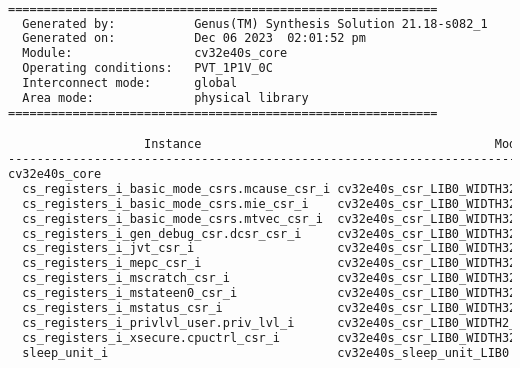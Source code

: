 \begin{lstlisting}[caption={Area report from synthesis of the CV32E40S.}, label=lst:cv32e40s_area, language=txt]

============================================================
  Generated by:           Genus(TM) Synthesis Solution 21.18-s082_1
  Generated on:           Dec 06 2023  02:01:52 pm
  Module:                 cv32e40s_core
  Operating conditions:   PVT_1P1V_0C 
  Interconnect mode:      global
  Area mode:              physical library
============================================================

                   Instance                                         Module                        Cell Count  Cell Area  Net Area   Total Area 
-----------------------------------------------------------------------------------------------------------------------------------------------
cv32e40s_core                                                                                          13525  42548.220 20572.873    63121.093 
  cs_registers_i_basic_mode_csrs.mcause_csr_i cv32e40s_csr_LIB0_WIDTH32_SHADOWCOPY1_RESETVALUE0_          29     43.776    39.057       82.833 
  cs_registers_i_basic_mode_csrs.mie_csr_i    cv32e40s_csr_LIB0_WIDTH32_SHADOWCOPY1_RESETVALUE0_          44     69.084    60.059      129.143 
  cs_registers_i_basic_mode_csrs.mtvec_csr_i  cv32e40s_csr_LIB0_WIDTH32_SHADOWCOPY1_RESETVALUE1_          62     96.102    84.367      180.469 
  cs_registers_i_gen_debug_csr.dcsr_csr_i     cv32e40s_csr_LIB0_WIDTH32_SHADOWCOPY1_RESETVALUE10          24     35.568    33.868       69.436 
  cs_registers_i_jvt_csr_i                    cv32e40s_csr_LIB0_WIDTH32_SHADOWCOPY1_RESETVALUE0_          62     96.102    84.367      180.469 
  cs_registers_i_mepc_csr_i                   cv32e40s_csr_LIB0_WIDTH32_SHADOWCOPY1_RESETVALUE0_          72    113.886    98.736      212.622 
  cs_registers_i_mscratch_csr_i               cv32e40s_csr_LIB0_WIDTH32_SHADOWCOPY1_RESETVALUE0_          75    116.964   102.062      219.026 
  cs_registers_i_mstateen0_csr_i              cv32e40s_csr_LIB0_WIDTH32_SHADOWCOPY1_RESETVALUE0_           2      3.078     2.585        5.663 
  cs_registers_i_mstatus_csr_i                cv32e40s_csr_LIB0_WIDTH32_SHADOWCOPY1_RESETVALUE61          14     22.572    19.519       42.091 
  cs_registers_i_privlvl_user.priv_lvl_i      cv32e40s_csr_LIB0_WIDTH2_SHADOWCOPY1_RESETVALUE3_M           5      7.524     6.272       13.796 
  cs_registers_i_xsecure.cpuctrl_csr_i        cv32e40s_csr_LIB0_WIDTH32_SHADOWCOPY1_RESETVALUE25          21     32.832    28.376       61.208 
  sleep_unit_i                                cv32e40s_sleep_unit_LIB0                                     7     21.204     4.067       25.271 


\end{lstlisting}

